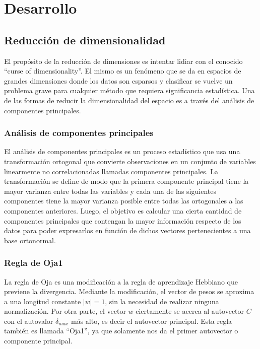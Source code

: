 \documentclass[informe.tex]{subfiles}
\begin{document}
  
  \section{Desarrollo}
    \subsection{Reducción de dimensionalidad}
	El propósito de la reducción de dimensiones es intentar lidiar con el conocido ``curse of dimensionality''. El mismo es un fenómeno que se da en espacios de grandes dimensiones donde los datos son esparsos y clasificar se vuelve un problema grave para cualquier método que requiera significancia estadística. Una de las formas de reducir la dimensionalidad del espacio es a través del análisis de componentes principales.
    
      \subsubsection{Análisis de componentes principales}
	El an\'alisis de componentes principales es un proceso estadístico que usa una transformaci\'on ortogonal que convierte observaciones en un conjunto de variables linearmente no correlacionadas llamadas componentes principales. La transformación se define de modo que la primera componente principal tiene la mayor varianza entre todas las variables y cada una de las siguientes componentes tiene la mayor varianza posible entre todas las ortogonales a las componentes anteriores. Luego, el objetivo es calcular una cierta cantidad de componentes principales que contengan la mayor información respecto de los datos para poder expresarlos en función de dichos vectores pertenecientes a una base ortonormal.
	
      \subsubsection{Regla de Oja1}
	La regla de Oja es una modificación a la regla de aprendizaje Hebbiano que previene la divergencia. Mediante la modificación, el vector de pesos se aproxima a una longitud constante $|w|=1$, sin la necesidad de realizar ninguna normalización. Por otra parte, el vector $w$ ciertamente se acerca al autovector $C$ con el autovalor $\delta_{max}$ más alto, es decir el autovector principal. Esta regla también es llamada ``Oja1'', ya que solamente nos da el primer autovector o componente principal.
	
	~
	
\end{document}

